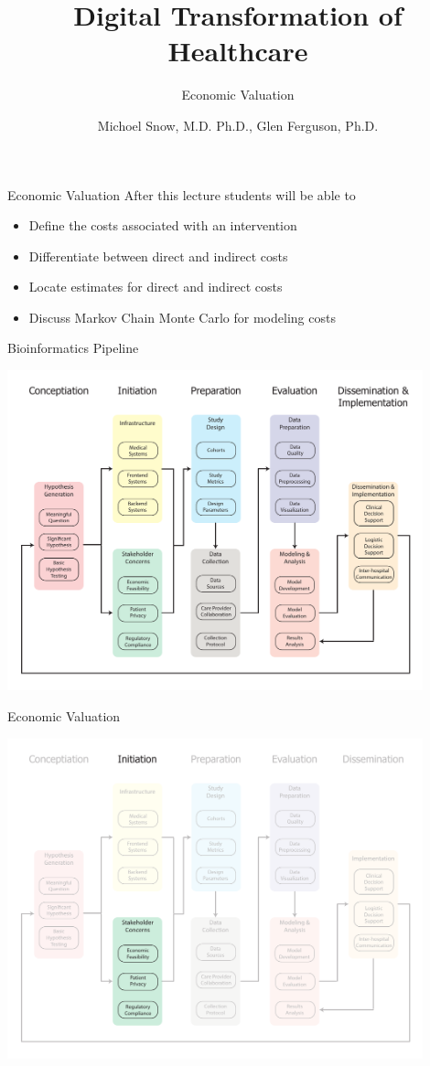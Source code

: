 \documentclass[10pt, xcolor=table]{beamer}
\title{Digital Transformation of Healthcare}
\subtitle{Economic Valuation}
\date{}
\author{Michoel Snow, M.D. Ph.D., Glen Ferguson, Ph.D.}
\institute{Center for Health Data Innovations}
\begin{document}
\maketitle


\begin{frame}{Economic Valuation}
	After this lecture students will be able to 
	\begin{itemize}
		\item Define the costs associated with an intervention
		\item Differentiate between direct and indirect costs 
		\item Locate estimates for direct and indirect costs
		\item Discuss Markov Chain Monte Carlo for modeling costs
	\end{itemize}
\end{frame}


\begin{frame}{Bioinformatics Pipeline}
	\begin{center}
		\includegraphics[width=0.9\textwidth]{images/informatics_pipeline.pdf}	
	\end{center}
\end{frame}


\begin{frame}{Economic Valuation}
	\begin{center}
		\includegraphics[width=0.9\textwidth]{images/informatics_pipeline_econ_value.pdf}	
	\end{center}
\end{frame}
\end{document}

